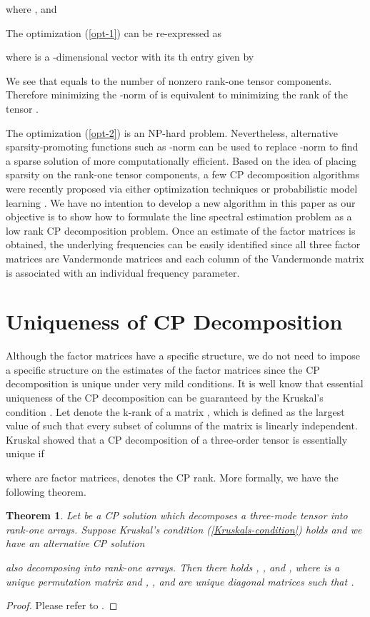\documentclass[10pt,journal,epsfig]{IEEEtran}
\begin{document}
where , and

The optimization (\ref{opt-1}) can be re-expressed as

where  is a -dimensional vector with
its th entry given by

We see that  equals to the number of
nonzero rank-one tensor components. Therefore minimizing the
-norm of  is equivalent to minimizing the
rank of the tensor .

The optimization (\ref{opt-2}) is an NP-hard problem.
Nevertheless, alternative sparsity-promoting functions such as
-norm can be used to replace -norm to find a
sparse solution of  more computationally
efficient. Based on the idea of placing sparsity on the rank-one
tensor components, a few CP decomposition algorithms were recently
proposed via either optimization techniques
\cite{MateosGiannakis13} or probabilistic model learning
\cite{RaiWang14,ZhaoZhang15}. We have no intention to develop a
new algorithm in this paper as our objective is to show how to
formulate the line spectral estimation problem as a low rank CP
decomposition problem. Once an estimate of the factor matrices is
obtained, the underlying frequencies can be easily identified
since all three factor matrices are Vandermonde matrices and each
column of the Vandermonde matrix is associated with an individual
frequency parameter.



\section{Uniqueness of CP Decomposition}
Although the factor matrices have a specific structure, we do not
need to impose a specific structure on the estimates of the factor
matrices since the CP decomposition is unique under very mild
conditions. It is well know that essential uniqueness of the CP
decomposition can be guaranteed by the Kruskal's condition
\cite{StegemanSidiropoulos07}. Let  denote the
k-rank of a matrix , which is defined as the
largest value of  such that every subset of
 columns of the matrix  is
linearly independent. Kruskal showed that a CP decomposition
 of a three-order
tensor is essentially unique if

where  are factor
matrices,  denotes the CP rank. More formally, we have the
following theorem.

\newtheorem{theorem}{Theorem}
\begin{theorem} \label{theorem1}
Let  be a CP
solution which decomposes a three-mode tensor
 into  rank-one arrays. Suppose
Kruskal's condition (\ref{Kruskals-condition}) holds and we have
an alternative CP solution

also decomposing  into  rank-one
arrays. Then there holds
,
,
and
,
where  is a unique permutation matrix and
, , and
 are unique diagonal matrices such that
.
\end{theorem}
\begin{proof}
Please refer to \cite{StegemanSidiropoulos07}.
\end{proof}
\end{document}

